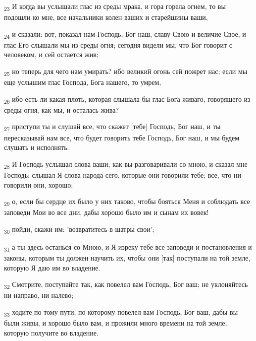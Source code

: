 \begin{tcolorbox}
\textsubscript{23} И когда вы услышали глас из среды мрака, и гора горела огнем, то вы подошли ко мне, все начальники колен ваших и старейшины ваши,
\end{tcolorbox}
\begin{tcolorbox}
\textsubscript{24} и сказали: вот, показал нам Господь, Бог наш, славу Свою и величие Свое, и глас Его слышали мы из среды огня; сегодня видели мы, что Бог говорит с человеком, и сей остается жив;
\end{tcolorbox}
\begin{tcolorbox}
\textsubscript{25} но теперь для чего нам умирать? ибо великий огонь сей пожрет нас; если мы еще услышим глас Господа, Бога нашего, то умрем,
\end{tcolorbox}
\begin{tcolorbox}
\textsubscript{26} ибо есть ли какая плоть, которая слышала бы глас Бога живаго, говорящего из среды огня, как мы, и осталась жива?
\end{tcolorbox}
\begin{tcolorbox}
\textsubscript{27} приступи ты и слушай все, что скажет [тебе] Господь, Бог наш, и ты пересказывай нам все, что будет говорить тебе Господь, Бог наш, и мы будем слушать и исполнять.
\end{tcolorbox}
\begin{tcolorbox}
\textsubscript{28} И Господь услышал слова ваши, как вы разговаривали со мною, и сказал мне Господь: слышал Я слова народа сего, которые они говорили тебе; все, что ни говорили они, хорошо;
\end{tcolorbox}
\begin{tcolorbox}
\textsubscript{29} о, если бы сердце их было у них таково, чтобы бояться Меня и соблюдать все заповеди Мои во все дни, дабы хорошо было им и сынам их вовек!
\end{tcolorbox}
\begin{tcolorbox}
\textsubscript{30} пойди, скажи им: 'возвратитесь в шатры свои';
\end{tcolorbox}
\begin{tcolorbox}
\textsubscript{31} а ты здесь останься со Мною, и Я изреку тебе все заповеди и постановления и законы, которым ты должен научить их, чтобы они [так] поступали на той земле, которую Я даю им во владение.
\end{tcolorbox}
\begin{tcolorbox}
\textsubscript{32} Смотрите, поступайте так, как повелел вам Господь, Бог ваш; не уклоняйтесь ни направо, ни налево;
\end{tcolorbox}
\begin{tcolorbox}
\textsubscript{33} ходите по тому пути, по которому повелел вам Господь, Бог ваш, дабы вы были живы, и хорошо было вам, и прожили много времени на той земле, которую получите во владение.
\end{tcolorbox}
